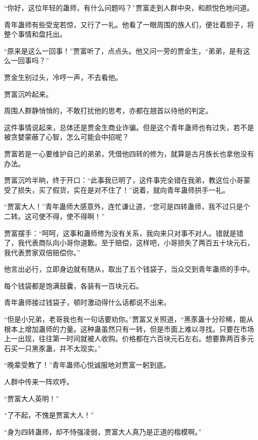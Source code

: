
\begin{this_body}

“你好，这位年轻的蛊师，有什么问题吗？”贾富走到人群中央，和颜悦色地问道。

青年蛊师有些受宠若惊，又行了一礼。他看了一眼周围的族人们，便壮着胆子，将整个事情和盘托出。

“原来是这么一回事！”贾富听了，点点头。他又问一旁的贾金生，“弟弟，是有这么一回事吗？”

贾金生别过头，冷哼一声，不去看他。

贾富沉吟起来。

周围人群静悄悄的，不敢打扰他的思考，亦都在翘首以待他的判定。

这件事情说起来，总体还是贾金生商业诈骗。但是这个青年蛊师也有过失，若不是被贪婪蒙蔽了心智，怎么可能会中招呢？

贾富若是一心要维护自己的弟弟，凭借他四转的修为，就算是古月族长也拿他没有办法。

贾富沉吟半晌，终于开口：“此事我已明了，这件事完全错在我弟，教这位小哥蒙受了损失，买了假货，实在是对不住了！”说着，就向青年蛊师拱手一礼。

“贾富大人！”青年蛊师大感意外，连忙谦让道，“您可是四转蛊师，我不过只是个二转。这可使不得，使不得啊！”

贾富摆手：“呵呵，这事和蛊师修为没有关系，我向来只对事不对人。错就是错了，我代表商队向小哥你道歉。至于赔偿，这样吧，小哥损失了两百五十块元石，我代表贾家双倍赔偿你。”

他言出必行，立即身边就有随从，取出了五个钱袋子，当众交到青年蛊师的手中。

每个钱袋都是饱满鼓囊，各装有一百块元石。

青年蛊师接过钱袋子，顿时激动得什么话都说不出来。

“但是小兄弟，老哥我也有一句话要劝你。”贾富又关照道，“黑豕蛊十分珍稀，能从根本上增加蛊师的力量。这种蛊虽然只有一转，但是市面上难以寻找。只要在市场上一出现，往往第一时间就被人收购。价格都在六百块元石左右。想要靠两百多元石买一只黑豕蛊，并不太现实。”

“晚辈受教了！”青年蛊师心悦诚服地对贾富一躬到底。

人群中传来一阵欢呼。

“贾富大人英明！”

“了不起，不愧是贾富大人！”

“身为四转蛊师，却不恃强凌弱，贾富大人真乃是正道的楷模啊。”


\end{this_body}
